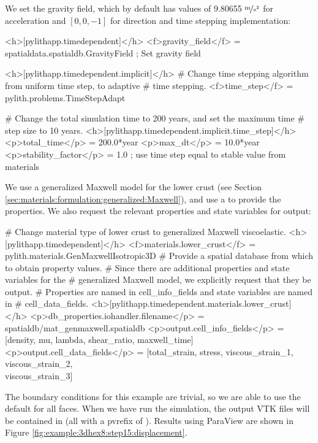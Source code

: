 We set the gravity field, which by default has values of 9.80655
$\unitfrac{m}{s^{2}}$ for acceleration and $\left[0,0,-1\right]$
for direction and time stepping implementation:
\begin{cfg}
<h>[pylithapp.timedependent]</h>
<f>gravity_field</f> = spatialdata.spatialdb.GravityField ; Set gravity field

<h>[pylithapp.timedependent.implicit]</h>
# Change time stepping algorithm from uniform time step, to adaptive
# time stepping.
<f>time_step</f> = pylith.problems.TimeStepAdapt

# Change the total simulation time to 200 years, and set the maximum time
# step size to 10 years.
<h>[pylithapp.timedependent.implicit.time_step]</h>
<p>total_time</p> = 200.0*year
<p>max_dt</p> = 10.0*year
<p>stability_factor</p> = 1.0 ; use time step equal to stable value from materials
\end{cfg}

We use a generalized Maxwell model for the lower crust (see Section
\vref{sec:materials:formulation:generalized:Maxwell}), and use a  to
provide the properties. We also request the relevant properties and
state variables for output:
\begin{cfg}
# Change material type of lower crust to generalized Maxwell viscoelastic.
<h>[pylithapp.timedependent]</h>
<f>materials.lower_crust</f> = pylith.materials.GenMaxwellIsotropic3D
# Provide a spatial database from which to obtain property values.
# Since there are additional properties and state variables for the
# generalized Maxwell model, we explicitly request that they be output.
# Properties are named in cell\_info\_fields and state variables are named in
# cell\_data\_fields.
<h>[pylithapp.timedependent.materials.lower_crust]</h>
<p>db_properties.iohandler.filename</p> = spatialdb/mat\_genmaxwell.spatialdb
<p>output.cell_info_fields</p> = [density, mu, lambda, shear_ratio, maxwell_time]
<p>output.cell_data_fields</p> = [total_strain, stress, viscous_strain_1, viscous_strain_2, \\
  viscous_strain_3]
\end{cfg}
The boundary conditions for this example are trivial, so we are able
to use the default  for all faces. When we have
run the simulation, the output VTK files will be contained in 
(all with a pvrefix of ). Results using ParaView are
shown in Figure \vref{fig:example:3dhex8:step15:displacement}.

